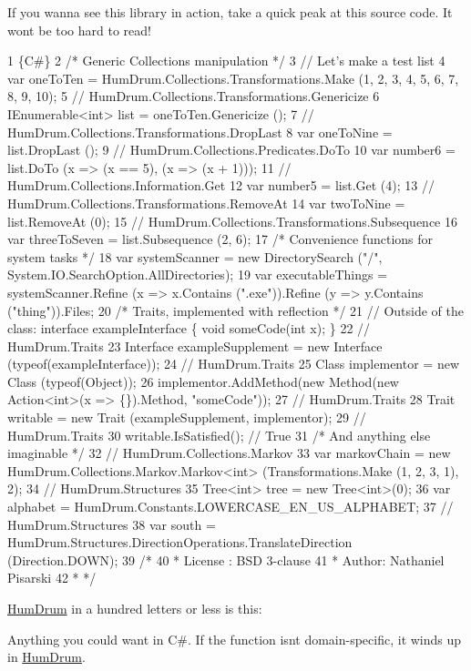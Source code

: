 If you wanna see this library in action, take a quick peak at this source code. It won\textquotesingle{}t be too hard to read!


\begin{DoxyCode}
1 \{C#\}
2 /* Generic Collections manipulation */
3 // Let's make a test list
4 var oneToTen = HumDrum.Collections.Transformations.Make (1, 2, 3, 4, 5, 6, 7, 8, 9, 10);
5 // HumDrum.Collections.Transformations.Genericize
6 IEnumerable<int> list = oneToTen.Genericize ();
7 // HumDrum.Collections.Transformations.DropLast
8 var oneToNine = list.DropLast ();
9 // HumDrum.Collections.Predicates.DoTo
10 var number6 = list.DoTo (x => (x == 5), (x => (x + 1)));
11 // HumDrum.Collections.Information.Get
12 var number5 = list.Get (4);
13 // HumDrum.Collections.Transformations.RemoveAt
14 var twoToNine = list.RemoveAt (0);
15 // HumDrum.Collections.Transformations.Subsequence
16 var threeToSeven = list.Subsequence (2, 6);
17 /* Convenience functions for system tasks */
18 var systemScanner = new DirectorySearch ("/", System.IO.SearchOption.AllDirectories);
19 var executableThings = systemScanner.Refine (x => x.Contains (".exe")).Refine (y => y.Contains
       ("thing")).Files;
20 /* Traits, implemented with reflection */
21 // Outside of the class: interface exampleInterface \{ void someCode(int x); \}
22 // HumDrum.Traits
23 Interface exampleSupplement = new Interface (typeof(exampleInterface));
24 // HumDrum.Traits
25 Class implementor = new Class (typeof(Object));
26 implementor.AddMethod(new Method(new Action<int>(x => \{\}).Method, "someCode"));
27 // HumDrum.Traits
28 Trait writable = new Trait (exampleSupplement, implementor);
29 // HumDrum.Traits
30 writable.IsSatisfied(); // True
31 /* And anything else imaginable */
32 // HumDrum.Collections.Markov
33 var markovChain = new HumDrum.Collections.Markov.Markov<int> (Transformations.Make (1, 2, 3, 1), 2);
34 // HumDrum.Structures
35 Tree<int> tree = new Tree<int>(0);
36 var alphabet = HumDrum.Constants.LOWERCASE\_EN\_US\_ALPHABET;
37 // HumDrum.Structures
38 var south = HumDrum.Structures.DirectionOperations.TranslateDirection (Direction.DOWN);
39 /*
40 * License : BSD 3-clause
41 * Author: Nathaniel Pisarski
42 * */
\end{DoxyCode}


\hyperlink{namespaceHumDrum}{Hum\+Drum} in a hundred letters or less is this\+:

Anything you could want in C\#. If the function isn\textquotesingle{}t domain-\/specific, it winds up in \hyperlink{namespaceHumDrum}{Hum\+Drum}.

